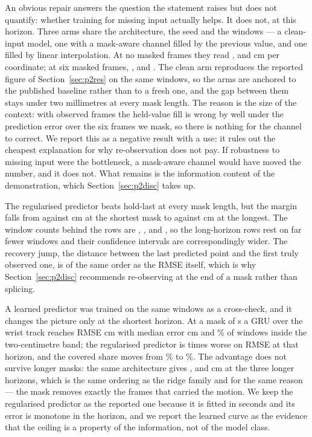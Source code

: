 \documentclass{swmcmthesis}
\begin{document}
An obvious repair answers the question the statement raises but does not quantify:
whether training for missing input actually helps. It does not, at this horizon. Three
arms share the architecture, the seed and the windows --- a clean-input model, one with a
mask-aware channel filled by the previous value, and one filled by linear interpolation.
At no masked frames they read \slotPCleanZero{}, \slotPLocfZero{} and \slotPInterpZero{}
cm per coordinate; at six masked frames, \slotPCleanSix{}, \slotPLocfSix{} and
\slotPInterpSix{}. The clean arm reproduces the reported figure of
Section~\ref{sec:p2res} on the same windows, so the arms are anchored to the published
baseline rather than to a fresh one, and the gap between them stays under two millimetres
at every mask length. The reason is the size of the context: with \slotCtx{} observed
frames the held-value fill is wrong by well under the prediction error over the six frames
we mask, so there is nothing for the channel to correct. We report this as a negative
result with a use: it rules out the cheapest explanation for why re-observation does not
pay. If robustness to missing input were the bottleneck, a mask-aware channel would have
moved the number, and it does not. What remains is the information content of the
demonstration, which Section~\ref{sec:p2disc} takes up.



The regularised predictor beats hold-last at every mask length, but the margin
falls from \slotPTwoARidgeRMSE{} against \slotPTwoAHoldRMSE{} cm at the shortest
mask to \slotPTwoDRidgeRMSE{} against \slotPTwoDHoldRMSE{} cm at the longest. The
window counts behind the rows are \slotPTwoWinA{}, \slotPTwoWinB{},
\slotPTwoWinC{} and \slotPTwoWinD{}, so the long-horizon rows rest on far fewer
windows and their confidence intervals are correspondingly wider. The recovery
jump, the distance between the last predicted point and the first truly observed
one, is of the same order as the RMSE itself, which is why Section~\ref{sec:p2disc}
recommends re-observing at the end of a mask rather than splicing.

A learned predictor was trained on the same windows as a cross-check, and it
changes the picture only at the shortest horizon. At a mask of \slotMaskA{} s a GRU
over the wrist track reaches RMSE \slotPGPUAWristRMSE{} cm with median error
\slotPGPUAWristMedian{} cm and \slotPGPUAWristWithinTwo{}\% of windows inside the
two-centimetre band; the regularised predictor is \slotPGpuRatio{} times worse on
RMSE at that horizon, and the covered share moves from
\slotPTwoARidgeWithinTwo{}\% to \slotPGPUAWristWithinTwo{}\%. The advantage does not
survive longer masks: the same architecture gives \slotPGPUBSTwoRMSE{},
\slotPGPUCBothRMSE{} and \slotPGPUDBothRMSE{} cm at the three longer horizons, which
is the same ordering as the ridge family and for the same reason --- the mask removes
exactly the frames that carried the motion. We keep the regularised predictor as the
reported one because it is fitted in seconds and its error is monotone in the
horizon, and we report the learned curve as the evidence that the ceiling is a
property of the information, not of the model class.
\end{document}

